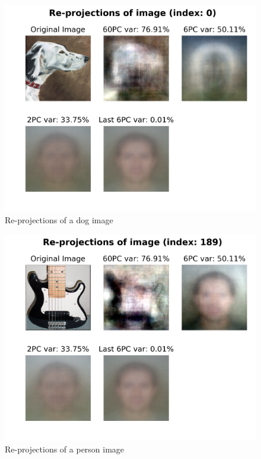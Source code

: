 \documentclass[a4paper, 11pt]{article}
\begin{document}
	\begin{figure}[ht!]
		\centering
		\includegraphics[height=0.5\paperwidth]{img/fig01a.png}
		\caption{Re-projections of a dog image}
		\label{fig:dog1}
	\end{figure}
	\begin{figure}[ht!]
		\centering
		\includegraphics[height=0.5\paperwidth]{img/fig01b.png}
		\caption{Re-projections of a person image}
		\label{fig:guitar1}
	\end{figure}
\end{document}
